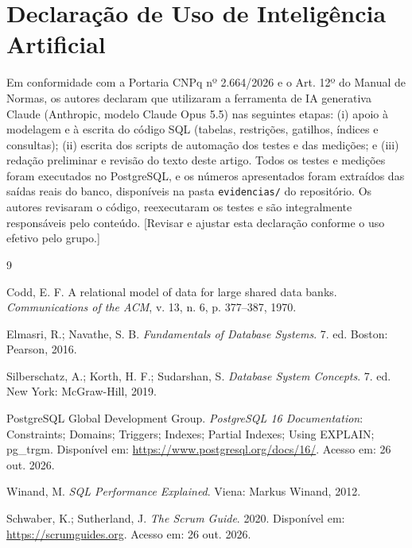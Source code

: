 \documentclass[a4paper,12pt]{article}
\newcommand{\cod}[1]{\texttt{\small #1}}
\begin{document}
\section*{Declaração de Uso de Inteligência Artificial}

Em conformidade com a Portaria CNPq nº 2.664/2026 e o Art. 12º do
Manual de Normas, os autores declaram que utilizaram a ferramenta de IA
generativa Claude (Anthropic, modelo Claude Opus 5.5) nas seguintes
etapas: (i) apoio à modelagem e à escrita do código SQL (tabelas,
restrições, gatilhos, índices e consultas); (ii) escrita dos scripts de
automação dos testes e das medições; e (iii) redação preliminar e
revisão do texto deste artigo. Todos os testes e medições foram
executados no PostgreSQL, e os números apresentados foram extraídos das
saídas reais do banco, disponíveis na pasta \cod{evidencias/} do
repositório. Os autores revisaram o código, reexecutaram os testes e são
integralmente responsáveis pelo conteúdo. [Revisar e ajustar esta
declaração conforme o uso efetivo pelo grupo.]

\begin{thebibliography}{9}

Codd, E. F.
\newblock A relational model of data for large shared data banks.
\newblock \emph{Communications of the ACM}, v. 13, n. 6, p. 377--387, 1970.

Elmasri, R.; Navathe, S. B.
\newblock \emph{Fundamentals of Database Systems}. 7. ed. Boston: Pearson, 2016.

Silberschatz, A.; Korth, H. F.; Sudarshan, S.
\newblock \emph{Database System Concepts}. 7. ed. New York: McGraw-Hill, 2019.

PostgreSQL Global Development Group.
\newblock \emph{PostgreSQL 16 Documentation}: Constraints; Domains;
Triggers; Indexes; Partial Indexes; Using EXPLAIN; pg\_trgm.
\newblock Disponível em: \url{https://www.postgresql.org/docs/16/}. Acesso em: 26 out. 2026.

Winand, M.
\newblock \emph{SQL Performance Explained}. Viena: Markus Winand, 2012.

Schwaber, K.; Sutherland, J.
\newblock \emph{The Scrum Guide}. 2020.
\newblock Disponível em: \url{https://scrumguides.org}. Acesso em: 26 out. 2026.

\end{thebibliography}
\end{document}
